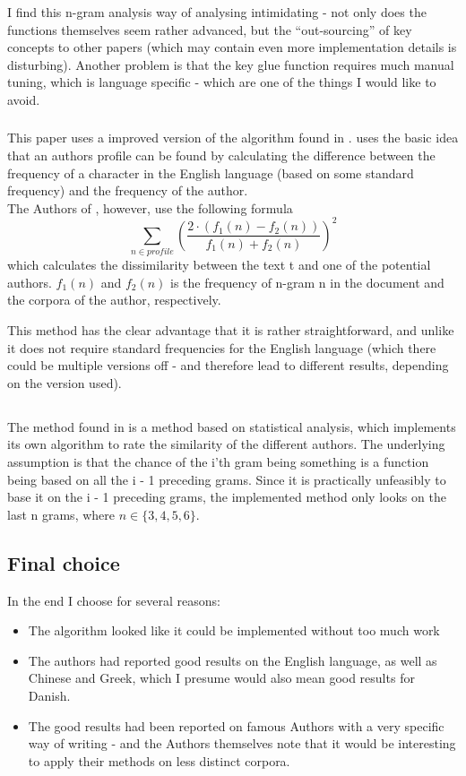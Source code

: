 I find this n-gram analysis way of analysing intimidating - not only does the functions themselves seem rather advanced, but the ``out-sourcing'' of key concepts to other papers (which may contain even more implementation details is disturbing). Another problem is that the key glue function requires much manual tuning, which is language specific - which are one of the things I would like to avoid. 

\subsubsection{\cite{nr2}}
This paper uses a improved version of the algorithm found in \cite{Bennet}. \cite{Bennet} uses the basic idea that an authors profile can be found by calculating the difference between the frequency of a character in the English language (based on some standard frequency) and the frequency of the author.\\

The Authors of \cite{nr2}, however, use the following formula
$$
\sum_{n \in profile}\left(\frac{2 \cdot (f_1(n) - f_2(n))}{f_1(n) + f_2(n)}\right)^2
$$
which calculates the dissimilarity between the text t and one of the potential authors. $f_1(n)$ and $f_2(n)$ is the frequency of n-gram n in the document and the corpora of the author, respectively. 

This method has the clear advantage that it is rather straightforward, and unlike \cite{Bennet} it does not require standard frequencies for the English language (which there could be multiple versions off - and therefore lead to different results, depending on the version used).

\subsection{\cite{nr4}}
The method found in \cite{nr4} is a method based on statistical analysis, which implements its own algorithm to rate the similarity of the different authors. The underlying assumption is that the chance of the i'th gram being something is a function being based on all the i - 1 preceding grams. Since it is practically unfeasibly to base it on the i - 1 preceding grams, the implemented method only looks on the last n grams, where $n \in \{3,4,5,6 \}$. 

\subsection{Final choice}

In the end I choose \cite{nr4} for several reasons:
\begin{itemize}
\item The algorithm looked like it could be implemented without too much work
\item The authors had reported good results on the English language, as well as Chinese and Greek, which I presume would also mean good results for Danish.
\item The good results had been reported on famous Authors with a very specific way of writing - and the Authors themselves note that it would be interesting to apply their methods on less distinct corpora. 
\end{itemize}
